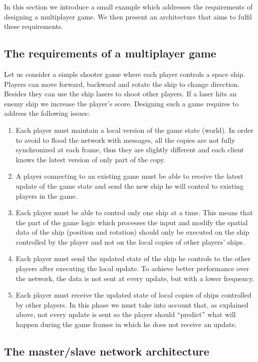 In this section we introduce a small example which addresses the requirements of designing a multiplayer game. We then present an architecture that aims to fulfil these requirements.

\subsection*{The requirements of a multiplayer game}
Let us consider a simple shooter game where each player controls a space ship. Players can move forward, backward and rotate the ship to change direction. Besides they can use the ship lasers to shoot other players. If a laser hits an enemy ship we increase the player's score. Designing such a game requires to address the following issues:

\begin{enumerate}
	\item Each player must maintain a local version of the game state (world). In order to avoid to flood the network with messages, all the copies are not fully synchronized at each frame, thus they are slightly different and each client knows the latest version of only part of the copy.
	\item A player connecting to an existing game must be able to receive the latest update of the game state and send the new ship he will control to existing players in the game.
	\item Each player must be able to control only one ship at a time. This means that the part of the game logic which processes the input and modify the spatial data of the ship (position and rotation) should only be executed on the ship controlled by the player and not on the local copies of other players' ships.
	\item Each player must send the updated state of the ship he controls to the other players after executing the local update. To achieve better performance over the network, the data is not sent at every update, but with a lower frequency.
	\item Each player must receive the updated state of local copies of ships controlled by other players. In this phase we must take into account that, as explained above, not every update is sent so the player should ``predict'' what will happen during the game frames in which he does not receive an update.
\end{enumerate}

\subsection*{The master/slave network architecture}

